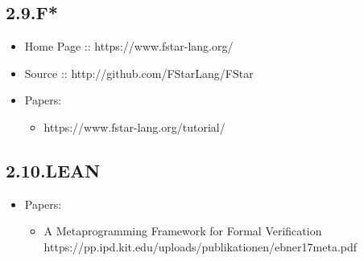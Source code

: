 \documentclass[12pt,twoside]{article}
\begin{document}
\subsection{2.9.\hspace*{0.5em}F*}\label{sec-f-}%

\begin{itemize}%

\item{}
Home Page :: https://www.fstar-lang.org/%

\item{}
Source :: http://github.com/FStarLang/FStar%

\item{}
Papers:%

\begin{itemize}[noitemsep,topsep=\mdcompacttopsep]%

\item{}https://www.fstar-lang.org/tutorial/%
\end{itemize}%
\end{itemize}%

\subsection{2.10.\hspace*{0.5em}LEAN}\label{sec-lean}%

\begin{itemize}[noitemsep,topsep=\mdcompacttopsep]%

\item{}Papers:

\begin{itemize}[noitemsep,topsep=\mdcompacttopsep]%

\item{}A Metaprogramming Framework for Formal Verification
https://pp.ipd.kit.edu/uploads/publikationen/ebner17meta.pdf%
\end{itemize}%
\end{itemize}%
\end{document}

